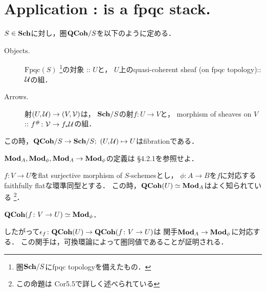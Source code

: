\documentclass[a4paper, dvipdfmx]{jsarticle}
\begin{document}
\section{Application :  is a fpqc stack.}

    \begin{Def}
    $S \in \mathbf{Sch}$に対し，圏$\mathbf{QCoh}/S$を以下のように定める．
    \begin{description}
        \item[Objects.] \mnewline
            $\mathrm{Fpqc}(S)$
            \footnote{圏$\mathbf{Sch}/S$にfpqc topologyを備えたもの．}の対象 :: $U$と，
            $U$上のquasi-coherent sheaf (on fpqc topology):: $\mathcal{U}$の組．
        \item[Arrows.] \mnewline
            射$(U, \mathcal{U}) \to (V, \mathcal{V})$は，
            $\mathbf{Sch}/S$の射$f \colon U \to V$と，
            morphism of sheaves on $V$ :: $f^{\#} \colon \mathcal{V} \to f_*\mathcal{U}$の組．
    \end{description}
    この時，$\mathbf{QCoh}/S \to \mathbf{Sch}/S; \ (U, \mathcal{U}) \mapsto U$はfibrationである．
    \end{Def}


    
    $\mathbf{Mod}_A, \mathbf{Mod}_{\phi}, \mathbf{Mod}_A \to \mathbf{Mod}_{\phi}$の定義は
    \cite{NoteGroTop} \S4.2.1を参照せよ．

    $f \colon V \to U$をflat surjective morphism of $S$-schemesとし，
    $\phi \colon A \to B$を$f$に対応するfaithfully flatな環準同型とする．
    この時，$\mathbf{QCoh}(U) \simeq \mathbf{Mod}_A$はよく知られている
    \footnote{この命題は\cite{HarAG} Cor5.5で詳しく述べられている}．
    \begin{Claim}
        $\mathbf{QCoh}(f \colon V \to U) \simeq \mathbf{Mod}_{\phi}$．
    \end{Claim}
    したがって$\epsilon_{f} \colon \mathbf{QCoh}(U) \to \mathbf{QCoh}(f \colon V \to U)$は
    関手$\mathbf{Mod}_A \to \mathbf{Mod}_{\phi}$に対応する．
    この関手は，可換環論によって圏同値であることが証明される．



\end{document}
